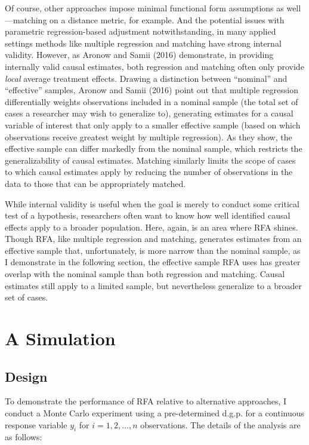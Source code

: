 \documentclass[11pt,]{article}
\begin{document}
Of course, other approaches impose minimal functional form assumptions
as well---matching on a distance metric, for example. And the potential
issues with parametric regression-based adjustment notwithstanding, in
many applied settings methods like multiple regression and matching have
strong internal validity. However, as Aronow and Samii (2016)
demonstrate, in providing internally valid causal estimates, both
regression and matching often only provide \emph{local} average
treatment effects. Drawing a distinction between ``nominal'' and
``effective'' samples, Aronow and Samii (2016) point out that multiple
regression differentially weights observations included in a nominal
sample (the total set of cases a researcher may wish to generalize to),
generating estimates for a causal variable of interest that only apply
to a smaller effective sample (based on which observations receive
greatest weight by multiple regression). As they show, the effective
sample can differ markedly from the nominal sample, which restricts the
generalizability of causal estimates. Matching similarly limits the
scope of cases to which causal estimates apply by reducing the number of
observations in the data to those that can be appropriately matched.

While internal validity is useful when the goal is merely to conduct
some critical test of a hypothesis, researchers often want to know how
well identified causal effects apply to a broader population. Here,
again, is an area where RFA shines. Though RFA, like multiple regression
and matching, generates estimates from an effective sample that,
unfortunately, is more narrow than the nominal sample, as I demonstrate
in the following section, the effective sample RFA uses has greater
overlap with the nominal sample than both regression and matching.
Causal estimates still apply to a limited sample, but nevertheless
generalize to a broader set of cases.

\hypertarget{a-simulation}{%
\section{A Simulation}\label{a-simulation}}

\hypertarget{design}{%
\subsection{Design}\label{design}}

To demonstrate the performance of RFA relative to alternative
approaches, I conduct a Monte Carlo experiment using a pre-determined
d.g.p. for a continuous response variable \(y_i\) for \(i = 1,2,...,n\)
observations. The details of the analysis are as follows:
\end{document}
